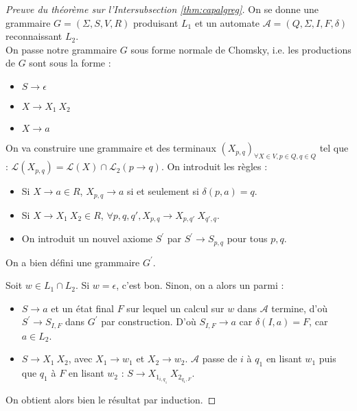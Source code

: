 \documentclass{cours}
\begin{document}
\begin{proof}[Preuve du théorème sur l'Intersubsection \ref{thm:capalgreg}]
    On se donne une grammaire $G = \left(\Sigma, S, V, R\right)$ produisant $L_{1}$ et un automate $\mathcal{A} = \left(Q, \Sigma, I, F, \delta\right)$ reconnaissant $L_{2}$.\\
    On passe notre grammaire $G$ sous forme normale de Chomsky, i.e. les productions de $G$ sont sous la forme : 
    \begin{itemize}
        \item $S \rightarrow \epsilon$
        \item $X \rightarrow X_{1}\ X_{2}$
        \item $X \rightarrow a$
    \end{itemize}
    On va construire une grammaire et des terminaux $(X_{p, q})_{\forall X\in V, p\in Q, q \in Q}$ tel que : $\mathcal{L}(X_{p, q}) = \mathcal{L}(X) \cap \mathcal{L}_{2}(p \rightarrow q)$. On introduit les règles : 
    \begin{itemize}
        \item Si $X \rightarrow a \in R$, $X_{p, q} \rightarrow a$ si et seulement si $\delta(p, a) = q$.
        \item Si $X \rightarrow X_{1}\ X_{2} \in R$, $\forall p, q, q', X_{p, q} \rightarrow X_{p, q'} \ X_{q', q}$.
        \item On introduit un nouvel axiome $S^{'}$ par $S^{'} \rightarrow S_{p, q}$ pour tous $p, q$.
    \end{itemize}
    On a bien défini une grammaire $G^{'}$.
    
    Soit $w \in L_{1} \cap L_{2}$. Si $w = \epsilon$, c'est bon. 
    Sinon, on a alors un parmi :
    \begin{itemize}
        \item $S\rightarrow a$ et un état final $F$ sur lequel un calcul sur $w$ dans $\mathcal{A}$ termine, d'où $S^{'}\rightarrow S_{I, F}$ dans $G^{'}$ par construction. D'où $S_{I,F} \rightarrow a$ car $\delta(I, a) = F$, car $a\in L_{2}$.
        \item $S \rightarrow X_{1}\ X_{2}$, avec $X_{1} \rightarrow w_{1}$ et $X_{2} \rightarrow w_{2}$. $\mathcal{A}$ passe de $i$ à $q_{1}$ en lisant $w_{1}$ puis que $q_{1}$ à $F$ en lisant $w_{2}$ : $S\rightarrow X_{1_{i, q_{1}}}\ X_{2_{q_{1}, F}}$.
    \end{itemize}
    On obtient alors bien le résultat par induction.
\end{proof}
\end{document}
